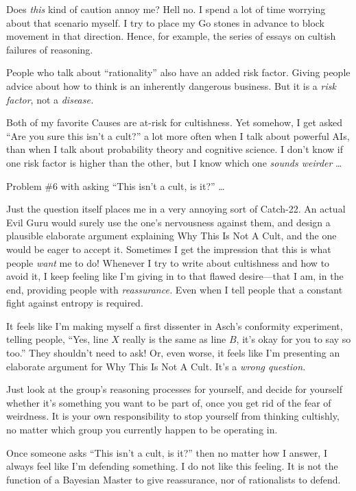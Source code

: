 {
 Does \textit{this} kind of caution annoy me? Hell no. I spend a
lot of time worrying about that scenario myself. I try to place my Go
stones in advance to block movement in that direction. Hence, for
example, the series of essays on cultish failures of reasoning.}

{
 People who talk about
``rationality'' also have an added
risk factor. Giving people advice about how to think is an inherently
dangerous business. But it is a \textit{risk factor}, not a
\textit{disease.}}

{
 Both of my favorite Causes are at-risk for cultishness. Yet
somehow, I get asked ``Are you sure this
isn't a cult?'' a lot more often when
I talk about powerful AIs, than when I talk about probability theory
and cognitive science. I don't know if one risk factor
is higher than the other, but I know which one \textit{sounds weirder}
\ldots}

{
 Problem \#6 with asking ``This
isn't a cult, is it?'' \ldots}

{
 Just the question itself places me in a very annoying sort of
Catch-22. An actual Evil Guru would surely use the
one's nervousness against them, and design a plausible
elaborate argument explaining Why This Is Not A Cult, and the one would
be eager to accept it. Sometimes I get the impression that this is what
people \textit{want} me to do! Whenever I try to write about
cultishness and how to avoid it, I keep feeling like
I'm giving in to that flawed desire---that I am, in the
end, providing people with \textit{reassurance.} Even when I tell
people that a constant fight against entropy is required.}

{
 It feels like I'm making myself a first dissenter
in Asch's conformity experiment, telling people,
``Yes, line $X$ really is the same as line $B$,
it's okay for you to say so too.''
They shouldn't need to ask! Or, even worse, it feels
like I'm presenting an elaborate argument for Why This
Is Not A Cult. It's a \textit{wrong question.}}

{
 Just look at the group's reasoning processes for
yourself, and decide for yourself whether it's
something you want to be part of, once you get rid of the fear of
weirdness. It is your own responsibility to stop yourself from thinking
cultishly, no matter which group you currently happen to be operating
in.}

{
 Once someone asks ``This isn't a
cult, is it?'' then no matter how I answer, I always
feel like I'm defending something. I do not like this
feeling. It is not the function of a Bayesian Master to give
reassurance, nor of rationalists to defend.}

